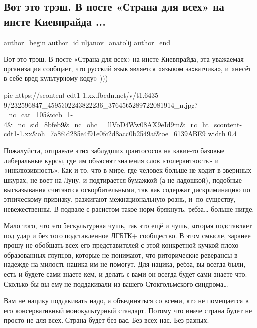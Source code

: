  
 
 
 
 
 
\subsection{Вот это трэш. В посте «Страна для всех» на инсте Киевпрайда ...}
\label{sec:05_08_2021.fb.uljanov_anatolij.1.kievprajd_mova}
 
\ifcmt
 author_begin
   author_id uljanov_anatolij
 author_end
\fi

Вот это трэш. В посте «Страна для всех» на инсте Киевпрайда, эта уважаемая
организация сообщает, что русский язык является «языком захватчика», и «несёт в
себе вред культурному коду» )))

\ifcmt
  pic https://scontent-cdt1-1.xx.fbcdn.net/v/t1.6435-9/232596847_4595302243822236_3764565289722081914_n.jpg?_nc_cat=105&ccb=1-4&_nc_sid=8bfeb9&_nc_ohc=_llVoD4Ww08AX9eId9m&_nc_ht=scontent-cdt1-1.xx&oh=7a8f4d285e4f91e0fc2d8acd0b2549af&oe=6139ABE9
  width 0.4
\fi

Пожалуйста, отправьте этих заблудших грантососов на какие-то базовые
либеральные курсы, где им объяснят значения слов «толерантность» и
«инклюзивность». Как и то, что в мире, где человек больше не ходит в звериных
шкурах, не воет на Луну, и подтирается бумажкой (а не ладошкой), подобные
высказывания считаются оскорбительными, так как содержат дискриминацию по
этническому признаку, разжигают межнациональную рознь, и, по существу,
невежественны. В подвале с расистом такое норм брякнуть, ребза… больше нигде.

Мало того, что это бескультурная чушь, так это ещё и чушь, которая подставляет
под удар и без того подставленное ЛГБТК+ сообщество. В этом смысле, заранее
прошу не обобщать всех его представителей с этой конкретной кучкой плохо
образованных глупцов, которые не понимают, что риторические реверансы в надежде
на милость нацика им не помогут. Для нацика, ребза, вы всегда были, есть и
будете сами знаете кем, и делать с вами он всегда будет сами знаете что.
Сколько бы вы ему не поддакивали из вашего Стокгольмского синдрома…

Вам не нацику поддакивать надо, а объединяться со всеми, кто не помещается в
его консервативный монокультурный стандарт. Потому что иначе страна будет не
просто не для всех. Страна будет без вас. Без всех нас. Без разных.

